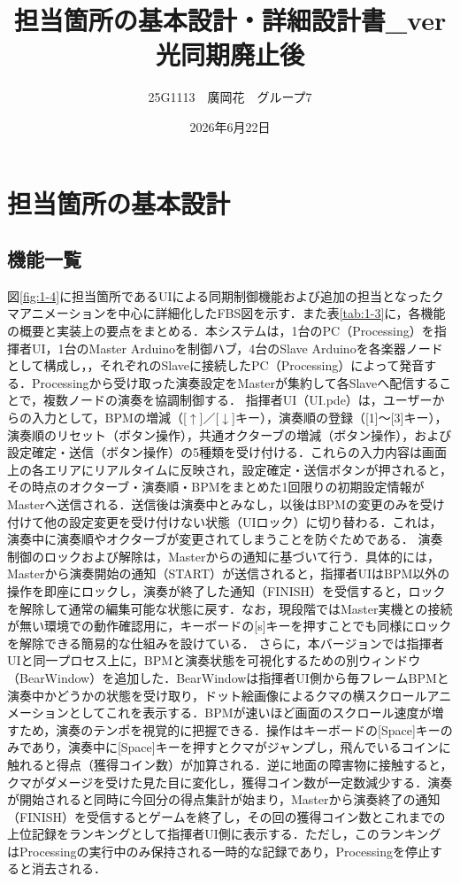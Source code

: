 \documentclass[uplatex,dvipdfmx]{jlreq}
\begin{document}
\title{担当箇所の基本設計・詳細設計書\_ver光同期廃止後}
\author{25G1113　廣岡花　グループ7}
\date{2026年6月22日}
\maketitle

\section{担当箇所の基本設計}
\subsection{機能一覧}
図\ref{fig:1-4}に担当箇所であるUIによる同期制御機能および追加の担当となったクマアニメーションを中心に詳細化したFBS図を示す．また表\ref{tab:1-3}に，各機能の概要と実装上の要点をまとめる．本システムは，1台のPC（Processing）を指揮者UI，1台のMaster Arduinoを制御ハブ，4台のSlave Arduinoを各楽器ノードとして構成し，，それぞれのSlaveに接続したPC（Processing）によって発音する．Processingから受け取った演奏設定をMasterが集約して各Slaveへ配信することで，複数ノードの演奏を協調制御する．
指揮者UI（UI.pde）は，ユーザーからの入力として，BPMの増減（[$\uparrow$]／[$\downarrow$]キー），演奏順の登録（[1]〜[3]キー），演奏順のリセット（ボタン操作），共通オクターブの増減（ボタン操作），および設定確定・送信（ボタン操作）の5種類を受け付ける．これらの入力内容は画面上の各エリアにリアルタイムに反映され，設定確定・送信ボタンが押されると，その時点のオクターブ・演奏順・BPMをまとめた1回限りの初期設定情報がMasterへ送信される．送信後は演奏中とみなし，以後はBPMの変更のみを受け付けて他の設定変更を受け付けない状態（UIロック）に切り替わる．これは，演奏中に演奏順やオクターブが変更されてしまうことを防ぐためである．
演奏制御のロックおよび解除は，Masterからの通知に基づいて行う．具体的には，Masterから演奏開始の通知（START）が送信されると，指揮者UIはBPM以外の操作を即座にロックし，演奏が終了した通知（FINISH）を受信すると，ロックを解除して通常の編集可能な状態に戻す．なお，現段階ではMaster実機との接続が無い環境での動作確認用に，キーボードの[s]キーを押すことでも同様にロックを解除できる簡易的な仕組みを設けている．
さらに，本バージョンでは指揮者UIと同一プロセス上に，BPMと演奏状態を可視化するための別ウィンドウ（BearWindow）を追加した．BearWindowは指揮者UI側から毎フレームBPMと演奏中かどうかの状態を受け取り，ドット絵画像によるクマの横スクロールアニメーションとしてこれを表示する．BPMが速いほど画面のスクロール速度が増すため，演奏のテンポを視覚的に把握できる．操作はキーボードの[Space]キーのみであり，演奏中に[Space]キーを押すとクマがジャンプし，飛んでいるコインに触れると得点（獲得コイン数）が加算される．逆に地面の障害物に接触すると，クマがダメージを受けた見た目に変化し，獲得コイン数が一定数減少する．演奏が開始されると同時に今回分の得点集計が始まり，Masterから演奏終了の通知（FINISH）を受信するとゲームを終了し，その回の獲得コイン数とこれまでの上位記録をランキングとして指揮者UI側に表示する．ただし，このランキングはProcessingの実行中のみ保持される一時的な記録であり，Processingを停止すると消去される．
\end{document}
